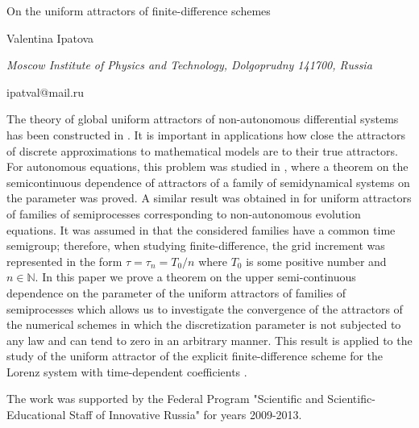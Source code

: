 \documentclass[10pt,a4paper]{article}
\begin{document}
\begin{center}

{\Large On the uniform attractors of finite-difference schemes}

\bigskip

{\sc Valentina Ipatova}

{\small\it Moscow Institute of Physics and Technology, Dolgoprudny 141700, Russia}

{\small\rm ipatval@mail.ru}

\end{center}

\bigskip

The theory of global uniform attractors of non-autonomous differential systems has been constructed in \cite{ipatova1}. It is important in applications how close the attractors of discrete approximations to mathematical models are to their true attractors. For autonomous equations, this problem was studied in \cite{ipatova2}, where a theorem on the semicontinuous dependence of attractors of
a family of semidynamical systems on the parameter was proved. A similar result was obtained in \cite{ipatova3} for uniform attractors of families of semiprocesses corresponding to non-autonomous evolution
equations. It was assumed in \cite{ipatova2,ipatova3} that the considered families have a common time semigroup;
therefore, when studying finite-difference, the grid increment was represented in the form $\tau =\tau_n=T_0/n$ where $T_0$ is some positive number and $n\in {\mathbb N}$.
In this paper we prove a theorem on the upper semi-continuous dependence on the parameter of the uniform attractors of families of semiprocesses \cite{ipatova4} which allows us to investigate the convergence of the attractors of the numerical schemes in which the discretization parameter is not subjected to any law and can tend to zero in an arbitrary manner.
This result is applied to the study of the uniform attractor of the explicit finite-difference scheme for the Lorenz system with time-dependent coefficients \cite{ipatova5}.

The work was supported by the Federal Program "Scientific and Scientific-Educational Staff of Innovative Russia" for years 2009-2013.
\end{document}
